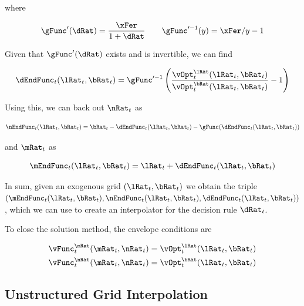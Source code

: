 \documentclass{article}
\begin{document}
where

\begin{equation}
\gFunc'(\dRat) =
    \frac{\xFer}{1+\dRat} \qquad \gFunc'^{-1}(y) = \xFer/y - 1
\end{equation}

Given that $\gFunc'(\dRat)$ exists and is invertible, we can find

\begin{equation}
\dEndFunc_{t}(\lRat_{t}, \bRat_{t}) = \gFunc'^{-1}\left(
    \frac{\vOpt_{t}^{\lRat}(\lRat_{t},
        \bRat_{t})}{\vOpt_{t}^{\bRat}(\lRat_{t},
        \bRat_{t})} - 1 \right)
\end{equation}

Using this, we can back out $\nRat_{t}$ as

\begin{equation}
\nEndFunc_{t}(\lRat_{t}, \bRat_{t}) = \bRat_{t} -
    \dEndFunc_{t}(\lRat_{t}, \bRat_{t}) - \gFunc(\dEndFunc_{t}(\lRat_{t},
        \bRat_{t}))
\end{equation}

and $\mRat_{t}$ as

\begin{equation}
\mEndFunc_{t}(\lRat_{t}, \bRat_{t}) = \lRat_{t} +
    \dEndFunc_{t}(\lRat_{t}, \bRat_{t})
\end{equation}

In sum, given an exogenous grid $(\lRat_{t}, \bRat_{t})$ we obtain the triple $\left(\mEndFunc_{t}(\lRat_{t}, \bRat_{t}), \nEndFunc_{t}(\lRat_{t}, \bRat_{t}), \dEndFunc_{t}(\lRat_{t}, \bRat_{t})\right)$, which we can use to create an interpolator for the decision rule $\dRat_{t}$.

To close the solution method, the envelope conditions are

\begin{equation}
\begin{split}
        \vFunc_{t}^{\mRat}(\mRat_{t}, \nRat_{t}) & =
        \vOpt_{t}^{\lRat}(\lRat_{t}, \bRat_{t}) \\
        \vFunc_{t}^{\nRat}(\mRat_{t}, \nRat_{t}) & =
        \vOpt_{t}^{\bRat}(\lRat_{t}, \bRat_{t})
    \end{split}
\end{equation}

\subsection{Unstructured Grid Interpolation}
\end{document}
